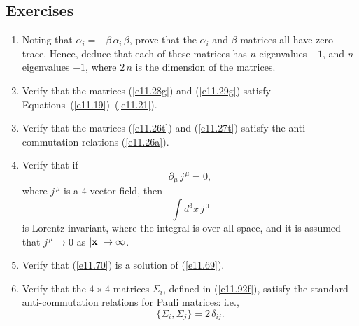 \subsection*{Exercises}
\begin{enumerate}[label=\thechapter.\arabic*,leftmargin=*,widest=9.20]
\item Noting that $\alpha_i=-\beta\,\alpha_i\,\beta$, prove that the $\alpha_i$ and $\beta$ matrices all have zero trace. Hence,
deduce that each of these matrices has $n$ eigenvalues $+1$, and $n$ eigenvalues $-1$, where $2\,n$ is the dimension
of the matrices. 
\item Verify that the matrices (\ref{e11.28g}) and (\ref{e11.29g}) satisfy Equations~(\ref{e11.19})--(\ref{e11.21}).
\item Verify that the matrices (\ref{e11.26t}) and (\ref{e11.27t}) satisfy the anti-commutation relations (\ref{e11.26a}).
\item Verify that if \label{ex11.4}
$$
\partial_\mu\,j^{\,\mu} = 0,
$$
where $j^{\,\mu}$ is a 4-vector field, then 
$$
\int d^3 x\,j^{\,0}
$$
is Lorentz invariant, where the integral is over all space, and it is assumed that  $j^{\,\mu}\rightarrow 0$ as $|{\bf x}|\rightarrow\infty$. 
\item Verify that (\ref{e11.70}) is a solution of (\ref{e11.69}). 
\item Verify that the $4\times 4$ matrices $\Sigma_i$, defined in (\ref{e11.92f}), satisfy the standard anti-commutation
relations for Pauli matrices: i.e., 
$$
\{\Sigma_i, \Sigma_j\} = 2\,\delta_{ij}.
$$
\end{enumerate}